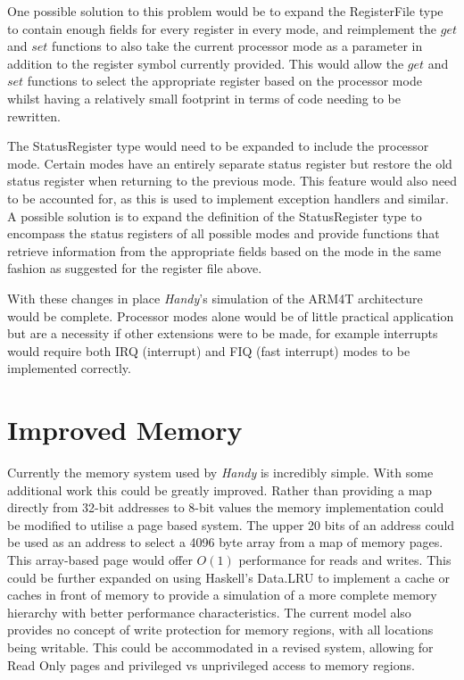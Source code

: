 One possible solution to this problem would be to expand the RegisterFile type to contain enough fields for every register in every mode, and reimplement the $get$ and $set$ functions to also take the current processor mode as a parameter in addition to the register symbol currently provided. This would allow the $get$ and $set$ functions to select the appropriate register based on the processor mode whilst having a relatively small footprint in terms of code needing to be rewritten.

The StatusRegister type would need to be expanded to include the processor mode. Certain modes have an entirely separate status register but restore the old status register when returning to the previous mode. This feature would also need to be accounted for, as this is used to implement exception handlers and similar. A possible solution is to expand the definition of the StatusRegister type to encompass the status registers of all possible modes and provide functions that retrieve information from the appropriate fields based on the mode in the same fashion as suggested for the register file above.

With these changes in place \emph{Handy}'s simulation of the ARM4T architecture would be complete. Processor modes alone would be of little practical application but are a necessity if other extensions were to be made, for example interrupts would require both IRQ (interrupt) and FIQ (fast interrupt) modes to be implemented correctly.


\section{Improved Memory}

Currently the memory system used by \emph{Handy} is incredibly simple. With some additional work this could be greatly improved. Rather than providing a map directly from 32-bit addresses to 8-bit values the memory implementation could be modified to utilise a page based system. The upper 20 bits of an address could be used as an address to select a 4096 byte array from a map of memory pages. This array-based page would offer $O(1)$ performance for reads and writes. This could be further expanded on using Haskell's Data.LRU to implement a cache or caches in front of memory to provide a simulation of a more complete memory hierarchy with better performance characteristics. The current model also provides no concept of write protection for memory regions, with all locations being writable. This could be accommodated in a revised system, allowing for Read Only pages and privileged vs unprivileged access to memory regions.

